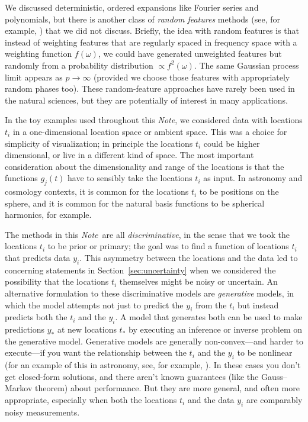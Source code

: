 \documentclass[12pt,letterpaper]{article}
\newcommand{\documentname}{\textsl{Note}}
\newcommand{\sectionname}{Section}
\begin{document}
We discussed deterministic, ordered expansions like Fourier series and polynomials, but there is another class of \emph{random features} methods (see, for example, \citealt{rahimi2007random}) that we did not discuss.
Briefly, the idea with random features is that instead of weighting features that are regularly spaced in frequency space with a weighting function $f(\omega)$, we could have generated unweighted features but randomly from a probability distribution $\propto f^2(\omega)$.
The same Gaussian process limit appears as $p\rightarrow\infty$ (provided we choose those features with appropriately random phases too).
These random-feature approaches have rarely been used in the natural sciences, but they are potentially of interest in many applications.

In the toy examples used throughout this \documentname, we considered data with locations $t_i$ in a one-dimensional location space or ambient space.
This was a choice for simplicity of visualization; in principle the locations $t_i$ could be higher dimensional, or live in a different kind of space.
The most important consideration about the dimensionality and range of the locations is that the functions $g_j(t)$ have to sensibly take the locations $t_i$ as input.
In astronomy and cosmology contexts, it is common for the locations $t_i$ to be positions on the sphere, and it is common for the natural basis functions to be spherical harmonics, for example.

The methods in this \documentname\ are all \emph{discriminative}, in the sense that we took the locations $t_i$ to be prior or primary;
the goal was to find a function of locations $t_i$ that predicts data $y_i$.
This asymmetry between the locations and the data led to concerning statements in \sectionname~\ref{sec:uncertainty} when we considered the possibility that the locations $t_i$ themselves might be noisy or uncertain.
An alternative formulation to these discriminative models are \emph{generative} models, in which the model attempts not just to predict the $y_i$ from the $t_i$ but instead predicts both the $t_i$ and the $y_i$.
A model that generates both can be used to make predictions $y_\ast$ at new locations $t_\ast$ by executing an inference or inverse problem on the generative model.
Generative models are generally non-convex---and harder to execute---if you want the relationship between the $t_i$ and the $y_i$ to be nonlinear (for an example of this in astronomy, see, for example, \citealt{thecannon}).
In these cases you don't get closed-form solutions, and there aren't known guarantees (like the Gauss--Markov theorem) about performance.
But they are more general, and often more appropriate, especially when both the locations $t_i$ and the data $y_i$ are comparably noisy measurements.
\end{document}
